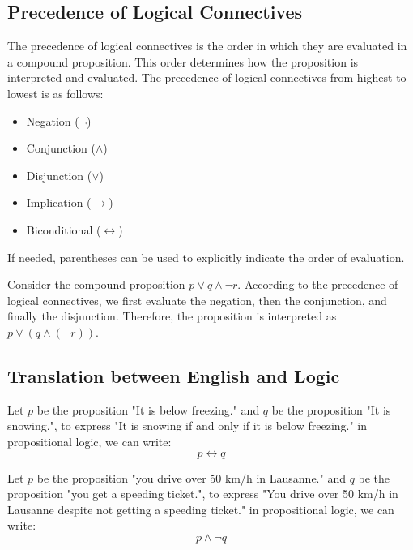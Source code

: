 \subsection{Precedence of Logical Connectives}
\begin{definition}
    The precedence of logical connectives is the order in which they are evaluated in a compound proposition. This order determines how the proposition is interpreted and evaluated. The precedence of logical connectives from highest to lowest is as follows:
    \begin{itemize}[itemsep=1pt,label=$\circ$]
        \item Negation ($\neg$)
        \item Conjunction ($\land$)
        \item Disjunction ($\lor$)
        \item Implication ($\to$) 
        \item Biconditional ($\leftrightarrow$)
    \end{itemize}
    If needed, parentheses can be used to explicitly indicate the order of evaluation.
\end{definition}
\begin{eg}
    Consider the compound proposition \(p \lor q \land \neg r\). According to the precedence of logical connectives, we first evaluate the negation, then the conjunction, and finally the disjunction. Therefore, the proposition is interpreted as \(p \lor (q \land (\neg r))\).
\end{eg}

\subsection{Translation between English and Logic}
\begin{eg}
    Let \(p\) be the proposition "It is below freezing." and \(q\) be the proposition "It is snowing.", to express "It is snowing if and only if it is below freezing." in propositional logic, we can write:
    \[ p \leftrightarrow q \]
\end{eg}
\begin{eg}
    Let \(p\) be the proposition "you drive over 50 km/h in Lausanne." and \(q\) be the proposition "you get a speeding ticket.", to express "You drive over 50 km/h in Lausanne despite not getting a speeding ticket." in propositional logic, we can write:
    \[ p \land \neg q \]
\end{eg}


